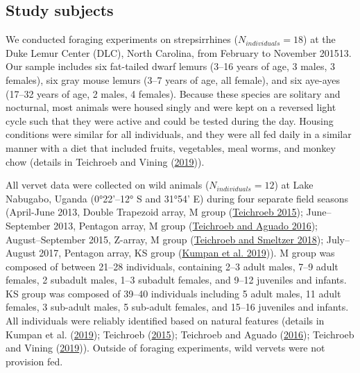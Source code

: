 \documentclass[twoside,12pt,final]{ucthesis-CA2012}
\begin{document}
\begin{ucmainmatter}
\hypertarget{study-subjects}{%
\subsection{Study subjects}\label{study-subjects}}

We conducted foraging experiments on strepsirrhines (\(N_{individuals} = 18\)) at the Duke Lemur Center (DLC), North Carolina, from February to November 201513. Our sample includes six fat-tailed dwarf lemurs (3--16 years of age, 3 males, 3 females), six gray mouse lemurs (3--7 years of age, all female), and six aye-ayes (17--32 years of age, 2 males, 4 females). Because these species are solitary and nocturnal, most animals were housed singly and were kept on a reversed light cycle such that they were active and could be tested during the day. Housing conditions were similar for all individuals, and they were all fed daily in a similar manner with a diet that included fruits, vegetables, meal worms, and monkey chow (details in Teichroeb and Vining (\protect\hyperlink{ref-teichroeb2019a}{2019})).

All vervet data were collected on wild animals (\(N_{individuals} = 12\)) at Lake Nabugabo, Uganda (0°22'--12° S and 31°54' E) during four separate field seasons (April-June 2013, Double Trapezoid array, M group (\protect\hyperlink{ref-teichroeb2015}{Teichroeb 2015}); June--September 2013, Pentagon array, M group (\protect\hyperlink{ref-teichroeb2016}{Teichroeb and Aguado 2016}); August--September 2015, Z-array, M group (\protect\hyperlink{ref-teichroeb2018}{Teichroeb and Smeltzer 2018}); July--August 2017, Pentagon array, KS group (\protect\hyperlink{ref-kumpan2019}{Kumpan et al. 2019})). M group was composed of between 21--28 individuals, containing 2--3 adult males, 7--9 adult females, 2 subadult males, 1--3 subadult females, and 9--12 juveniles and infants. KS group was composed of 39--40 individuals including 5 adult males, 11 adult females, 3 sub-adult males, 5 sub-adult females, and 15--16 juveniles and infants. All individuals were reliably identified based on natural features (details in Kumpan et al. (\protect\hyperlink{ref-kumpan2019}{2019}); Teichroeb (\protect\hyperlink{ref-teichroeb2015}{2015}); Teichroeb and Aguado (\protect\hyperlink{ref-teichroeb2016}{2016}); Teichroeb and Vining (\protect\hyperlink{ref-teichroeb2019a}{2019})). Outside of foraging experiments, wild vervets were not provision fed.


\end{ucmainmatter}
\end{document}
